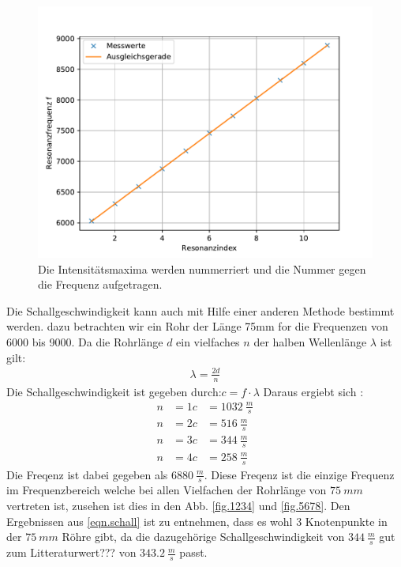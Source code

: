 \begin{figure}[h!]
  \centering
  \includegraphics[width=\textwidth]{versuch3.pdf}
  \caption{Die Intensitätsmaxima werden nummerriert und die Nummer gegen die Frequenz aufgetragen.}
  \label{fig.versuch3}
\end{figure}
\FloatBarrier
Die Schallgeschwindigkeit kann auch mit Hilfe einer anderen Methode bestimmt werden.
dazu betrachten wir ein Rohr der Länge 75mm for die Frequenzen von 6000 bis 9000.
Da die Rohrlänge $d$ ein vielfaches $n$ der halben Wellenlänge $\lambda$ ist gilt:
\begin{align*}
  \lambda = \frac{2d}{n}
\end{align*}
Die Schallgeschwindigkeit ist gegeben durch:$c=f \cdot \lambda$
Daraus ergiebt sich :
\begin{align}
  n&=1  c&=\SI{1032}{\frac{m}{s}}\\
  n&=2  c&=\SI{516}{\frac{m}{s}}\\
  n&=3  c&=\SI{344}{\frac{m}{s}}\\
  \label{eqn.schall}
  n&=4  c&=\SI{258}{\frac{m}{s}}
\end{align}
Die Freqenz ist dabei gegeben als $\SI{6880}{\frac{m}{s}}$.
Diese Freqenz ist die einzige Frequenz im Frequenzbereich welche bei allen Vielfachen der Rohrlänge von $\SI{75}{mm}$ vertreten ist,
zusehen ist dies in den Abb. \ref{fig.1234} und \ref{fig.5678}.
Den Ergebnissen aus \ref{eqn.schall} ist zu entnehmen, dass es wohl 3 Knotenpunkte in der $\SI{75}{mm}$ Röhre gibt, da die dazugehörige Schallgeschwindigkeit von $\SI{344}{\frac{m}{s}}$ gut zum Litteraturwert??? von $\SI{343.2}{\frac{m}{s}}$ passt.

